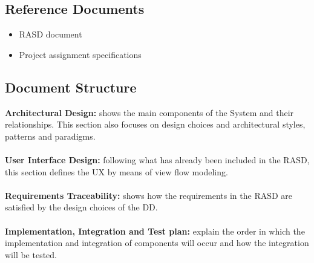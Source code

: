 

\subsection{Reference Documents}
    \begin{itemize}
        \item RASD document
        \item Project assignment specifications
    \end{itemize}

\subsection{Document
Structure}

\textbf{Architectural Design:} shows the main components of the System and their relationships. This section also focuses on design choices and architectural styles, patterns and paradigms.\\\\
\textbf{User Interface Design:} following what has already been included in the RASD, this section defines the UX by means of view flow modeling.\\\\
\textbf{Requirements Traceability:} shows how the requirements in the RASD are satisfied by the design choices of the DD.\\\\
\textbf{Implementation, Integration and Test plan:} explain the order in which the implementation and integration of components will occur and how the integration will be tested.\\